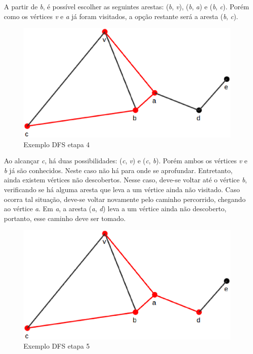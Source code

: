\begin{apendicesenv}
A partir de \textit{b}, é possível escolher as seguintes arestas: (\textit{b}, \textit{v}), (\textit{b}, \textit{a}) e (\textit{b}, \textit{c}). Porém como os vértices \textit{v} e \textit{a} já foram visitados, a opção restante será a aresta (\textit{b}, \textit{c}).

\begin{figure}[!h]
	\centering
	\includegraphics[scale=0.25]{figuras/capitulo2/dfs/dfs4.eps}
	\caption[Exemplo DFS etapa 4]{Exemplo DFS etapa 4 \cite{Cormen:2001}}
	\label{dfs4}
\end{figure}

Ao alcançar \textit{c}, há duas possibilidades: (\textit{c}, \textit{v}) e (\textit{c}, \textit{b}). Porém ambos os vértices \textit{v} e \textit{b} já são conhecidos. Neste caso não há para onde se aprofundar. Entretanto, ainda existem vértices não descobertos. Nesse caso, deve-se voltar até o vértice \textit{b}, verificando se há alguma aresta que leva a um vértice ainda não visitado. Caso ocorra tal situação, deve-se voltar novamente pelo caminho percorrido, chegando ao vértice \textit{a}. Em \textit{a}, a aresta (\textit{a}, \textit{d}) leva a um vértice ainda não descoberto, portanto, esse caminho deve ser tomado.

\begin{figure}[!h]
	\centering
	\includegraphics[scale=0.25]{figuras/capitulo2/dfs/dfs5.eps}
	\caption[Exemplo DFS etapa 5]{Exemplo DFS etapa 5 \cite{Cormen:2001}}
	\label{dfs5}
\end{figure}


\end{apendicesenv}
